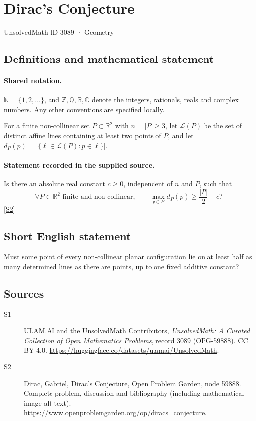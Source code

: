\documentclass[11pt]{book}
\newcommand{\sref}[2]{\hyperlink{source:#1:#2}{[S#2]}}
\begin{document}
\setcounter{section}{3088}
\section{Dirac's Conjecture}\label{3089}
{\small\sffamily UnsolvedMath ID 3089 · Geometry}
\subsection{Definitions and mathematical statement}

\paragraph{Shared notation.}$\mathbb N=\{1,2,\ldots\}$, and $\mathbb Z,\mathbb Q,\mathbb R,\mathbb C$ denote the integers, rationals, reals and complex numbers. Any other conventions are specified locally.


For a finite non-collinear set $P\subset\mathbb R^2$ with $n=|P|\geq3$, let $\mathcal L(P)$ be the set of distinct affine lines containing at least two points of $P$, and let $d_P(p)=|\{\ell\in\mathcal L(P):p\in\ell\}|$.
\paragraph{Statement recorded in the supplied source.}
Is there an absolute real constant $c\geq0$, independent of $n$ and $P$, such that
\[\forall P\subset\mathbb R^2\text{ finite and non-collinear},\qquad\max_{p\in P}d_P(p)\geq \frac{|P|}{2}-c?\] \sref{3089}{2}
\subsection{Short English statement}
Must some point of every non-collinear planar configuration lie on at least half as many determined lines as there are points, up to one fixed additive constant?
\subsection{Sources}
\begin{description}
\item[\hypertarget{source:3089:1}{S1}] ULAM.AI and the UnsolvedMath Contributors, \emph{UnsolvedMath: A Curated Collection of Open Mathematics Problems}, record 3089 (OPG-59888). CC BY 4.0. \url{https://huggingface.co/datasets/ulamai/UnsolvedMath}.
\item[\hypertarget{source:3089:2}{S2}] Dirac, Gabriel, Dirac's Conjecture, Open Problem Garden, node 59888. Complete problem, discussion and bibliography (including mathematical image alt text). \url{https://www.openproblemgarden.org/op/diracs_conjecture}.
\end{description}
\label{end:3089}
\end{document}
